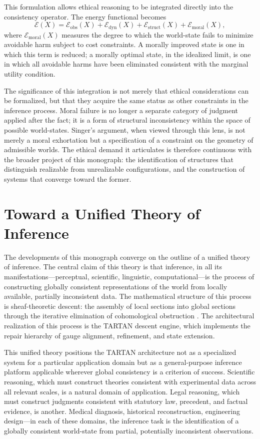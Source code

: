 \documentclass[11pt, oneside]{article}
\begin{document}
This formulation allows ethical reasoning to be integrated directly into the consistency operator. The energy functional becomes
\[
\mathcal{E}(X) = \mathcal{E}_{\mathrm{obs}}(X) + \mathcal{E}_{\mathrm{dyn}}(X) + \mathcal{E}_{\mathrm{struct}}(X) + \mathcal{E}_{\mathrm{moral}}(X),
\]
where $\mathcal{E}_{\mathrm{moral}}(X)$ measures the degree to which the world-state fails to minimize avoidable harm subject to cost constraints. A morally improved state is one in which this term is reduced; a morally optimal state, in the idealized limit, is one in which all avoidable harms have been eliminated consistent with the marginal utility condition.

The significance of this integration is not merely that ethical considerations can be formalized, but that they acquire the same status as other constraints in the inference process. Moral failure is no longer a separate category of judgment applied after the fact; it is a form of structural inconsistency within the space of possible world-states. Singer's argument, when viewed through this lens, is not merely a moral exhortation but a specification of a constraint on the geometry of admissible worlds. The ethical demand it articulates is therefore continuous with the broader project of this monograph: the identification of structures that distinguish realizable from unrealizable configurations, and the construction of systems that converge toward the former.

\section{Toward a Unified Theory of Inference}

The developments of this monograph converge on the outline of a unified theory of inference. The central claim of this theory is that inference, in all its manifestations---perceptual, scientific, linguistic, computational---is the process of constructing globally consistent representations of the world from locally available, partially inconsistent data. The mathematical structure of this process is sheaf-theoretic descent: the assembly of local sections into global sections through the iterative elimination of cohomological obstruction \cite{mac2013categories, riehl2017category}. The architectural realization of this process is the TARTAN descent engine, which implements the repair hierarchy of gauge alignment, refinement, and state extension.

This unified theory positions the TARTAN architecture not as a specialized system for a particular application domain but as a general-purpose inference platform applicable wherever global consistency is a criterion of success. Scientific reasoning, which must construct theories consistent with experimental data across all relevant scales, is a natural domain of application. Legal reasoning, which must construct judgments consistent with statutory law, precedent, and factual evidence, is another. Medical diagnosis, historical reconstruction, engineering design---in each of these domains, the inference task is the identification of a globally consistent world-state from partial, potentially inconsistent observations.
\end{document}
